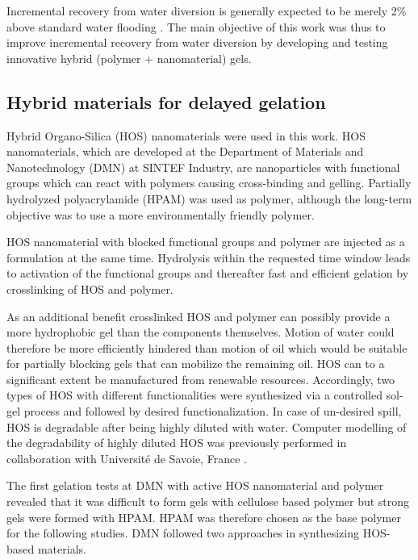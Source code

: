 \documentclass[nanomaterials,article,submit,moreauthors,pdftex]{Definitions/mdpi}
\begin{document}
Incremental recovery from water diversion is generally expected to be merely 2\% above standard water flooding \citep{OG21}. The main objective of this work was thus to improve incremental recovery from water diversion by developing and testing innovative hybrid (polymer + nanomaterial) gels.

\subsection{Hybrid materials for delayed gelation}
Hybrid Organo-Silica (HOS) nanomaterials were used in this work. HOS nanomaterials, which are developed at  the  Department  of  Materials  and  Nanotechnology (DMN) at  SINTEF  Industry, are nanoparticles with functional groups which can react with polymers causing cross-binding and gelling. Partially hydrolyzed polyacrylamide (HPAM)  was used as polymer, although the long-term objective was to use a more environmentally friendly polymer.

HOS nanomaterial with blocked functional groups and polymer are injected as a formulation at the same time. Hydrolysis within the requested time window leads to activation of the functional groups and thereafter fast and efficient gelation by crosslinking of HOS and polymer. 

As an additional benefit crosslinked HOS and polymer can possibly provide a more hydrophobic gel than the components themselves. Motion of water could therefore be more efficiently hindered than motion of oil which would be suitable for partially blocking gels that can mobilize the remaining oil. HOS can to a significant extent be manufactured from renewable resources. Accordingly, two types of HOS with different functionalities were synthesized via a controlled sol-gel process and followed by desired functionalization. In case of un-desired spill, HOS is degradable after being highly diluted with water. Computer modelling of the degradability of highly diluted HOS was previously performed in collaboration with Université de Savoie, France \citep{Neyertz2012,Neyertz2013}.

The first gelation tests at DMN with active HOS nanomaterial and polymer revealed that it was difficult to form gels with cellulose based polymer but strong gels were formed with HPAM. HPAM was therefore chosen as the base polymer for the following studies. DMN followed two approaches in synthesizing HOS-based materials.
\end{document}
